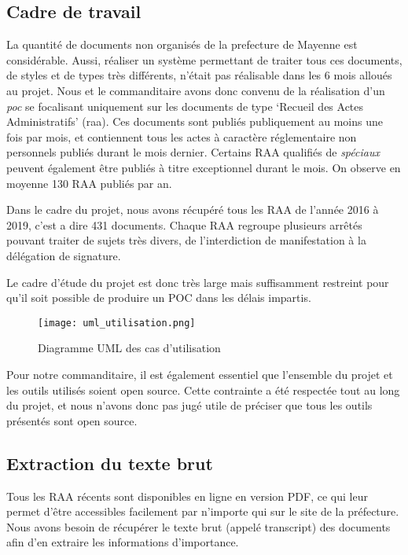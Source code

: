
\subsection{Cadre de travail}
La quantité de documents non organisés de la prefecture de Mayenne est considérable.
Aussi, réaliser un système permettant de traiter tous ces documents, de styles et de types très différents, n'était pas réalisable dans les 6 mois alloués au projet.
Nous et le commanditaire avons donc convenu de la réalisation d'un \textit{\gls{poc}} se focalisant uniquement sur les documents de type `Recueil des Actes Administratifs' (\gls{raa}).
Ces documents sont publiés publiquement au moins une fois par mois, et contiennent tous les actes à caractère réglementaire non personnels publiés durant le mois dernier.
Certains RAA qualifiés de \textit{spéciaux} peuvent également être publiés à titre exceptionnel durant le mois.
On observe en moyenne 130 RAA publiés par an.

Dans le cadre du projet, nous avons récupéré tous les RAA de l'année 2016 à 2019, c'est a dire 431 documents.
Chaque RAA regroupe plusieurs arrêtés pouvant traiter de sujets très divers, de l'interdiction de manifestation à la délégation de signature.

Le cadre d'étude du projet est donc très large mais suffisamment restreint pour qu'il soit possible de produire un POC dans les délais impartis. 

\begin{figure}[h!]
  \centering
  \texttt{[image: uml\_utilisation.png]}
	\caption[]{Diagramme UML des cas d'utilisation}
	\label{fig:umlUtilisation}
\end{figure}

Pour notre commanditaire, il est également essentiel que l'ensemble du projet et les outils utilisés soient open source.
Cette contrainte a été respectée tout au long du projet, et nous n'avons donc pas jugé utile de préciser que tous les outils présentés sont open source.

\subsection{Extraction du texte brut}
Tous les RAA récents sont disponibles en ligne en version PDF, ce qui leur permet d'être accessibles facilement par n'importe qui sur le site de la préfecture.
Nous avons besoin de récupérer le texte brut (appelé transcript) des documents afin d'en extraire les informations d'importance.

